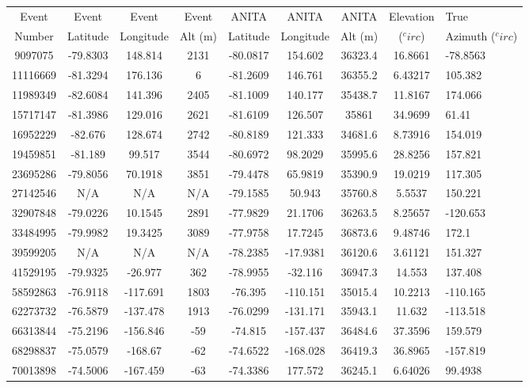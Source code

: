 	\begin{figure}
	\centering
	\begin{tabular}{|c|c|c|c|c|c|c|c|l|}
	\hline
	Event &	Event 	&	Event 	&	Event 	&	ANITA &	ANITA &	ANITA &	Elevation &	True \\
	Number&	Latitude &	Longitude & Alt (m) &	Latitude	&Longitude	&	Alt (m)	&  ($^circ$)	&	Azimuth ($^circ$) \\
	\hline
	9097075	 &	-79.8303 &	148.814	&	2131&	-80.0817&	154.602	&	36323.4	&	16.8661	&	-78.8563 \\
	11116669 &	-81.3294 &	176.136	&	6	&	-81.2609&	146.761	&	36355.2	&	6.43217 &	105.382 \\
	11989349 &	-82.6084 &	141.396	&	2405&	-81.1009&	140.177	&	35438.7	&	11.8167	&	174.066 \\
	15717147 &	-81.3986 &	129.016	&	2621&	-81.6109&	126.507	&	35861	&	34.9699	&	61.41 \\
	16952229 &	-82.676	 &	128.674	&	2742&	-80.8189&	121.333	&	34681.6	&	8.73916	&	154.019 \\
	19459851 &	-81.189	 &	99.517	&	3544&	-80.6972&	98.2029	&	35995.6	&	28.8256	&	157.821 \\
	23695286 &	-79.8056 &	70.1918	&	3851&	-79.4478&	65.9819	&	35390.9	&	19.0219	&	117.305 \\
	27142546 &	  N/A	 &	N/A 	&	N/A &	-79.1585&	50.943	&	35760.8	&	5.5537	&	150.221 \\
	32907848 &	-79.0226 &	10.1545	&	2891&	-77.9829&	21.1706	&	36263.5	&	8.25657	&	-120.653 \\
	33484995 &	-79.9982 &	19.3425	&	3089&	-77.9758&	17.7245	&	36873.6	&	9.48746	&	172.1 \\
	39599205 &	  N/A	 &	 N/A	&	N/A &	-78.2385&	-17.9381&	36120.6	&	3.61121	&	151.327 \\
	41529195 &	-79.9325 &	-26.977	&	362	&	-78.9955&	-32.116	&	36947.3	&	14.553	&	137.408 \\
	58592863 &	-76.9118 &	-117.691&	1803&	-76.395	&	-110.151 &	35015.4	&	10.2213	&	-110.165 \\
	62273732 &	-76.5879 &	-137.478&	1913&	-76.0299&	-131.171 &	35943.1	&	11.632	&	-113.518 \\
	66313844 &	-75.2196 &	-156.846&	-59	&	-74.815	&	-157.437 &	36484.6	&	37.3596	&	159.579 \\
	68298837 &	-75.0579 &	-168.67	&	-62	&	-74.6522&	-168.028 &	36419.3	&	36.8965	&	-157.819 \\
	70013898 &	-74.5006 &	-167.459&	-63	&	-74.3386&	177.572	&	36245.1	&	6.64026	&	99.4938 \\

\end{tabular}
\end{figure}
